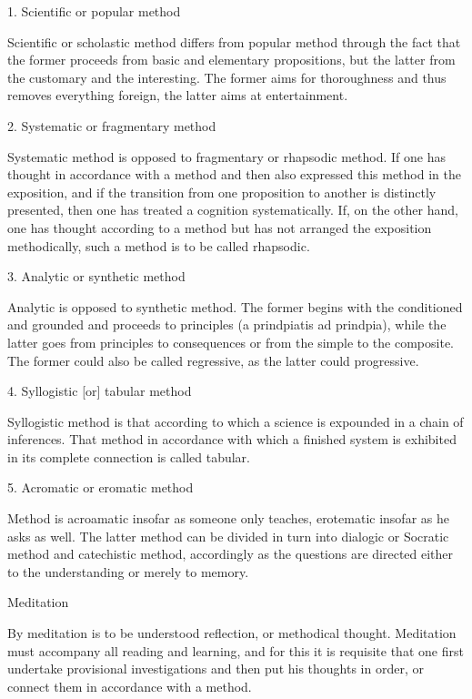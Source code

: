     1. Scientific or popular method

    Scientific or scholastic method differs from popular method
    through the fact that the former proceeds from
    basic and elementary propositions,
    but the latter from the customary and the interesting.
    The former aims for thoroughness and thus removes everything foreign,
    the latter aims at entertainment.

    2. Systematic or fragmentary method

    Systematic method is opposed to fragmentary or rhapsodic method.
    If one has thought in accordance with a method and then also expressed this
    method in the exposition, and if the transition from one proposition to
    another is distinctly presented, then one has treated a cognition systematically.
    If, on the other hand, one has thought according to a method but has
    not arranged the exposition methodically, such a method is to be called rhapsodic.

    3. Analytic or synthetic method

    Analytic is opposed to synthetic method.
    The former begins with the conditioned and grounded and
    proceeds to principles (a prindpiatis ad prindpia),
    while the latter goes from principles to consequences or
    from the simple to the composite.
    The former could also be called regressive,
    as the latter could progressive.

    4. Syllogistic [or] tabular method

    Syllogistic method is that according to which
    a science is expounded in a chain of inferences.
    That method in accordance with which a finished system is
    exhibited in its complete connection is called tabular.

    5. Acromatic or eromatic method

    Method is acroamatic insofar as someone only teaches,
    erotematic insofar as he asks as well.
    The latter method can be divided in turn
    into dialogic or Socratic method and catechistic method,
    accordingly as the questions are directed
    either to the understanding or merely to memory.

    Meditation

    By meditation is to be understood reflection, or methodical thought.
    Meditation must accompany all reading and learning,
    and for this it is requisite that
    one first undertake provisional investigations
    and then put his thoughts in order,
    or connect them in accordance with a method.

